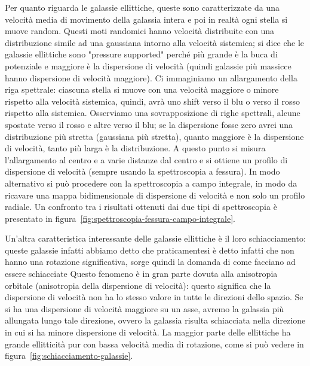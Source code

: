 Per quanto riguarda le galassie ellittiche, queste sono caratterizzate da una velocità media di movimento della galassia intera e poi in realtà ogni stella si muove random. Questi moti randomici hanno velocità distribuite con una distribuzione simile ad una gaussiana intorno alla velocità sistemica; si dice che le galassie ellittiche sono "pressure supported" perché più grande è la buca di potenziale e maggiore è la dispersione di velocità (quindi galassie più massicce hanno dispersione di velocità maggiore). Ci immaginiamo un allargamento della riga spettrale: ciascuna stella si muove con una velocità maggiore o minore rispetto alla velocità sistemica, quindi, avrà uno shift verso il blu o verso il rosso rispetto alla sistemica. Osserviamo una sovrapposizione di righe spettrali, alcune spostate verso il rosso e altre verso il blu; se la dispersione fosse zero avrei una distribuzione più stretta (gaussiana più stretta), quanto maggiore è la dispersione di velocità, tanto più larga è la distribuzione. A questo punto si misura l’allargamento al centro e a varie distanze dal centro e si ottiene un profilo di dispersione di velocità (sempre usando la spettroscopia a fessura). In modo alternativo si può procedere con la spettroscopia a campo integrale, in modo da ricavare una mappa bidimensionale di dispersione di velocità e non solo un profilo radiale. Un confronto tra i risultati ottenuti dai due tipi di spettroscopia è presentato in figura~\ref{fig:spettroscopia-fessura-campo-integrale}.

Un'altra caratteristica interessante delle galassie ellittiche è il loro schiacciamento: queste galassie infatti abbiamo detto che praticamentesi è detto infatti che non hanno una rotazione significativa, sorge quindi la domanda di come facciano ad essere schiacciate Questo fenomeno è in gran parte dovuta alla anisotropia orbitale (anisotropia della dispersione di velocità): questo significa che la dispersione di velocità non ha lo stesso valore in tutte le direzioni dello spazio. Se si ha una dispersione di velocità maggiore su un asse, avremo la galassia più allungata lungo tale direzione, ovvero la galassia risulta schiacciata nella direzione in cui si ha minore dispersione di velocità. La maggior parte delle ellittiche ha grande ellitticità pur con bassa velocità media di rotazione, come si può vedere in figura~\ref{fig:schiacciamento-galassie}.

